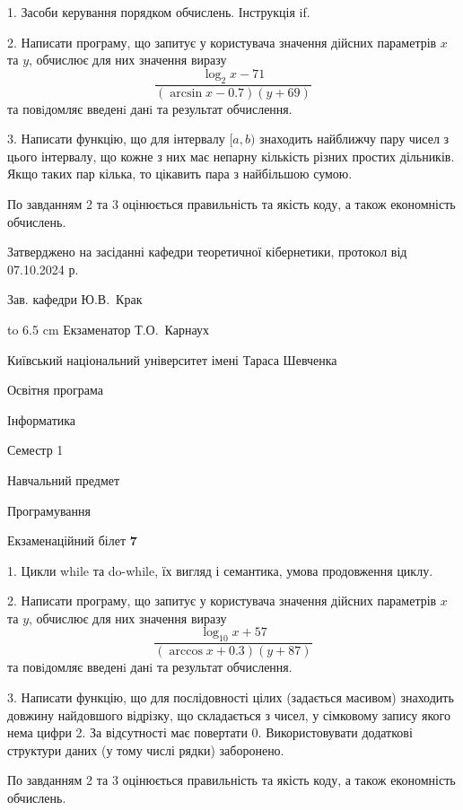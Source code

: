 \documentclass[12pt, ukrainian]{article}
\begin{document}
{%
1. Засоби керування порядком обчислень. Інструкція if.%
\par
2. Написати програму, що запитує у користувача значення дійсних параметрів $x$ та $y$, обчислює для них значення виразу 
$$\frac{\log_{2} x - 71}{(\arcsin x - 0.7) (y + 69)}$$ 
та повiдомляє введенi данi та результат обчислення.

\par
3. Написати функцію, що для інтервалу $[a, b)$ знаходить найближчу пару чисел з цього інтервалу, що кожне з них має непарну кількість різних простих дільників. Якщо таких пар кілька, то цікавить пара з найбільшою сумою.

По завданням 2 та 3 оцінюється правильність та якість коду, а також економність обчислень.

}
{\smallskip\smallskip \begin {scriptsize} Затверджено на засіданні кафедри теоретичної кібернетики, протокол   від   07.10.2024 р.\par\smallskip\smallskip\smallskip\smallskip
{\parbox {6.5 cm} {Зав. кафедри \dotfill Ю.В.~Крак}}\hspace {0.7cm} {\hbox to 6.5 cm { Екзаменатор \dotfill Т.О.~Карнаух}} \end{scriptsize}}
\newpage
{{\begin {scriptsize}\par
{ \center  Київський національний університет імені Тараса Шевченка \par}
{\parbox {5 cm}{Освітня програма \hfill}{\parbox {7 cm}{Інформатика\hfill}}\parbox {6 cm}{\hfill Семестр 1}}\par
{\parbox {5 cm} {Навчальний предмет \hfill}\parbox {7 cm}{Програмування \hfill}\parbox {6cm}{\hfill}\par}\vspace{-15pt} \end{scriptsize}}{\center Екзаменаційний білет \No \textbf { 7 }\par}}
{%
1. Цикли while та do-while, їх вигляд і семантика, умова продовження циклу.%
\par
2. Написати програму, що запитує у користувача значення дійсних параметрів $x$ та $y$, обчислює для них значення виразу 
$$\frac{\log_{10} x + 57}{(\arccos x + 0.3) (y + 87)}$$ 
та повiдомляє введенi данi та результат обчислення.

\par
3. Написати функцію, що для послідовності цілих (задається масивом) знаходить довжину найдовшого відрізку, що складається з чисел, у сімковому запису якого нема цифри 2. За відсутності має повертати $0$. Використовувати додаткові структури даних (у тому числі рядки) заборонено.

По завданням 2 та 3 оцінюється правильність та якість коду, а також економність обчислень.

}
\end{document}

